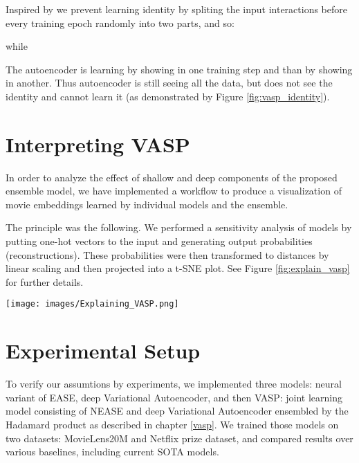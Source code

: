 \documentclass[conference]{IEEEtran}
\begin{document}
        Inspired by \cite{zhang2017split} we prevent learning identity by spliting the input interactions  before every training epoch randomly into two parts,  and  so:
        
             while 
            
        
        
        The autoencoder is learning  by showing  in one training step and than  by showing  in another.  Thus autoencoder is still seeing all the data, but does not see the identity and cannot learn it (as demonstrated by Figure \ref{fig:vasp_identity}).
            


\section{Interpreting VASP}
In order to analyze the effect of shallow and deep components of the proposed ensemble model, we have implemented a workflow to produce a visualization of movie embeddings learned by individual models and the ensemble.

The principle was the following. We performed a sensitivity analysis of models by putting one-hot vectors to the input and generating output probabilities (reconstructions). These probabilities were then transformed to distances by linear scaling and then projected into a t-SNE plot. See Figure \ref{fig:explain_vasp} for further details.
  \begin{figure*}
            \centering 
            \texttt{[image: images/Explaining\_VASP.png]} 
            \caption{Explaining VASP on MovieLens20M Dataset: Output of the joint model (left) was linearly decomposed to EASE component (middle) and FLVAE component (right) to demonstrate that EASE is learning more apparent linear dependencies and FLVAE the non-linear ones. Red = Horrors, Blue = Children movies, Green = Western movies and Yellow = Noir.
            }
            \label{fig:explain_vasp}
    \end{figure*}  
   
\section{Experimental Setup}\label{expsetup}
  
    To verify our assumtions by experiments, we implemented three models: neural variant of EASE, deep Variational Autoencoder, and then VASP: joint learning model consisting of NEASE and deep Variational Autoencoder ensembled by the Hadamard product as described in chapter \ref{vasp}. We trained those models on two datasets: MovieLens20M and Netflix prize dataset, and compared results over various baselines, including current SOTA models.
    
\end{document}
